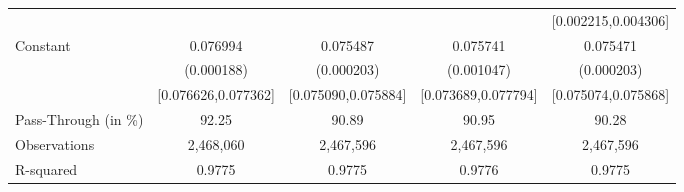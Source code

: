 {\begin{tabular}{l*{4}{c}}
                    &                     &                     &                     &[0.002215,0.004306]         \\
Constant            &    0.076994\sym{***}&    0.075487\sym{***}&    0.075741\sym{***}&    0.075471\sym{***}\\
                    &  (0.000188)         &  (0.000203)         &  (0.001047)         &  (0.000203)         \\
                    &[0.076626,0.077362]         &[0.075090,0.075884]         &[0.073689,0.077794]         &[0.075074,0.075868]         \\
\midrule
Pass-Through (in \%)&       92.25         &       90.89         &       90.95         &       90.28         \\
Observations        &   2,468,060         &   2,467,596         &   2,467,596         &   2,467,596         \\
R-squared           &      0.9775         &      0.9775         &      0.9776         &      0.9775         \\
\bottomrule
\end{tabular}
}
